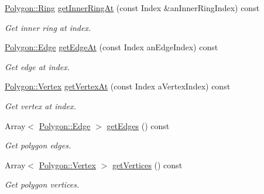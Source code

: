 \begin{DoxyCompactItemize}
\hyperlink{classlibrary_1_1math_1_1geom_1_1d2_1_1objects_1_1_polygon_aa543e7078b73e1d307ca8317d765cd9c}{Polygon\+::\+Ring} \hyperlink{classlibrary_1_1math_1_1geom_1_1d2_1_1objects_1_1_polygon_ad6014927b89b109098b60861213ea9ed}{get\+Inner\+Ring\+At} (const Index \&an\+Inner\+Ring\+Index) const
\begin{DoxyCompactList}\small\item\em Get inner ring at index. \end{DoxyCompactList}\item 
\hyperlink{classlibrary_1_1math_1_1geom_1_1d2_1_1objects_1_1_polygon_a17e3083d71685e16f3244298e6f44ad9}{Polygon\+::\+Edge} \hyperlink{classlibrary_1_1math_1_1geom_1_1d2_1_1objects_1_1_polygon_a92d93fe3b0f2d2b17b393475f3e1c090}{get\+Edge\+At} (const Index an\+Edge\+Index) const
\begin{DoxyCompactList}\small\item\em Get edge at index. \end{DoxyCompactList}\item 
\hyperlink{classlibrary_1_1math_1_1geom_1_1d2_1_1objects_1_1_polygon_a1559cddbcb23d41f2be9e389b0ccd127}{Polygon\+::\+Vertex} \hyperlink{classlibrary_1_1math_1_1geom_1_1d2_1_1objects_1_1_polygon_a3d592373be3ef2a722cfd70935f47832}{get\+Vertex\+At} (const Index a\+Vertex\+Index) const
\begin{DoxyCompactList}\small\item\em Get vertex at index. \end{DoxyCompactList}\item 
Array$<$ \hyperlink{classlibrary_1_1math_1_1geom_1_1d2_1_1objects_1_1_polygon_a17e3083d71685e16f3244298e6f44ad9}{Polygon\+::\+Edge} $>$ \hyperlink{classlibrary_1_1math_1_1geom_1_1d2_1_1objects_1_1_polygon_a22fbf3d4f9553311497d20b9495841a7}{get\+Edges} () const
\begin{DoxyCompactList}\small\item\em Get polygon edges. \end{DoxyCompactList}\item 
Array$<$ \hyperlink{classlibrary_1_1math_1_1geom_1_1d2_1_1objects_1_1_polygon_a1559cddbcb23d41f2be9e389b0ccd127}{Polygon\+::\+Vertex} $>$ \hyperlink{classlibrary_1_1math_1_1geom_1_1d2_1_1objects_1_1_polygon_ae73d59e0e0bb5d13bd69e2924e602e20}{get\+Vertices} () const
\begin{DoxyCompactList}\small\item\em Get polygon vertices. \end{DoxyCompactList}\item 

\end{DoxyCompactItemize}
